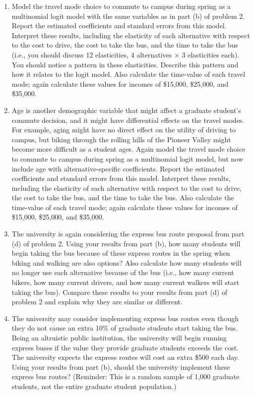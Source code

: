 \documentclass[11pt,letterpaper]{article}
\begin{document}
\begin{enumerate}[label=\alph*., leftmargin=*]
	\item Model the travel mode choice to commute to campus during spring as a multinomial logit model with the same variables as in part (b) of problem 2. Report the estimated coefficients and standard errors from this model. Interpret these results, including the elasticity of each alternative with respect to the cost to drive, the cost to take the bus, and the time to take the bus (i.e., you should discuss 12 elasticities, 4 alternatives $\times$ 3 elasticities each). You should notice a pattern in these elasticities. Describe this pattern and how it relates to the logit model. Also calculate the time-value of each travel mode; again calculate these values for incomes of \$15,000, \$25,000, and \$35,000.

	\item Age is another demographic variable that might affect a graduate student's commute decision, and it might have differential effects on the travel modes. For example, aging might have no direct effect on the utility of driving to campus, but biking through the rolling hills of the Pioneer Valley might become more difficult as a student ages. Again model the travel mode choice to commute to campus during spring as a multinomial logit model, but now include age with alternative-specific coefficients. Report the estimated coefficients and standard errors from this model. Interpret these results, including the elasticity of each alternative with respect to the cost to drive, the cost to take the bus, and the time to take the bus. Also calculate the time-value of each travel mode; again calculate these values for incomes of \$15,000, \$25,000, and \$35,000.

	\item The university is again considering the express bus route proposal from part (d) of problem 2. Using your results from part (b), how many students will begin taking the bus because of these express routes in the spring when biking and walking are also options? Also calculate how many students will no longer use each alternative because of the bus (i.e., how many current bikers, how many current drivers, and how many current walkers will start taking the bus). Compare these results to your results from part (d) of problem 2 and explain why they are similar or different.

	\item The university may consider implementing express bus routes even though they do not cause an extra 10\% of graduate students start taking the bus. Being an altruistic public institution, the university will begin running express buses if the value they provide graduate students exceeds the cost. The university expects the express routes will cost an extra \$500 each day. Using your results from part (b), should the university implement these express bus routes? (Reminder: This is a random sample of 1,000 graduate students, not the entire graduate student population.)
\end{enumerate}
\end{document}

